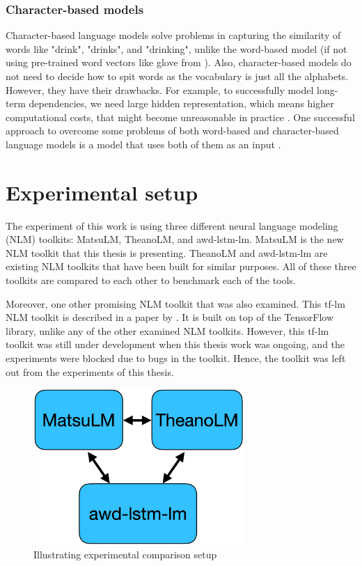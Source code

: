 \subsection{Character-based models}
Character-based language models solve problems in capturing the similarity of words like "drink", "drinks", and "drinking", unlike the word-based model (if not using pre-trained word vectors like glove from \textcite{pennington2014glove}). Also, character-based models do not need to decide how to spit words as the vocabulary is just all the alphabets. However, they have their drawbacks. For example, to successfully model long-term dependencies, we need large hidden representation, which means higher computational costs, that might become unreasonable in practice \parencite{bojanowski2015alternative}. One successful approach to overcome some problems of both word-based and character-based language models is a model that uses both of them as an input \parencite{verwimp2017character,jurafsky2014speech}. 



\chapter{Experimental setup}

The experiment of this work is using three different neural language modeling (NLM) toolkits: MatsuLM, TheanoLM, and awd-lstm-lm. MatsuLM is the new NLM toolkit that this thesis is presenting. TheanoLM and awd-lstm-lm are existing NLM toolkits that have been built for similar purposes. All of these three toolkits are compared to each other to benchmark each of the tools.

Moreover, one other promising NLM toolkit that was also examined. This tf-lm NLM toolkit is described in a paper by \textcite{verwimp2019tf}. It is built on top of the TensorFlow library, unlike any of the other examined NLM toolkits. However, this tf-lm toolkit was still under development when this thesis work was ongoing, and the experiments were blocked due to bugs in the toolkit. Hence, the toolkit was left out from the experiments of this thesis.

\begin{figure}[h]
    \centering
    \includegraphics[width=8cm,height=\textheight,keepaspectratio]{experimental_setup}
    \caption{Illustrating experimental comparison setup}
    \label{fig:experimental_setup}
\end{figure}


